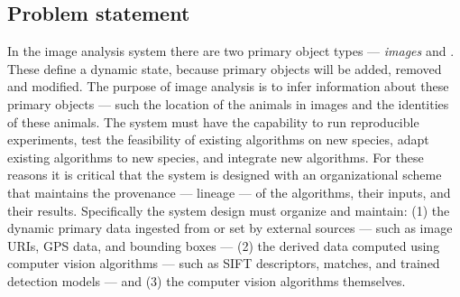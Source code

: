    \subsection{Problem statement}
    In the \IBEIS{} image analysis system there are two primary object types
      --- \emph{images} and \emph{\annots{}}.
    These  define a dynamic state, because primary
      objects will be added, removed and modified.
    The purpose of image analysis is to infer information about these primary
      objects --- such the location of the animals in images and the identities
      of these animals.
    The system must have the capability to %
    run reproducible experiments, %
    test the feasibility of existing algorithms on new species, %
    adapt existing algorithms to new species, %
    and integrate new algorithms.
    For these reasons it is critical that the system is designed with an
      organizational scheme that maintains the provenance --- lineage --- of the
      algorithms, their inputs, and their results.
    Specifically the system design must organize and maintain:
    (1) the dynamic primary data ingested from or set by external sources %
    --- such as image URIs, GPS data, and \annot{} bounding boxes ---
    (2) the derived data computed using computer vision algorithms %
    --- such as SIFT descriptors, \annot{} matches, and trained detection
      models --- and
    (3) the computer vision algorithms themselves.


